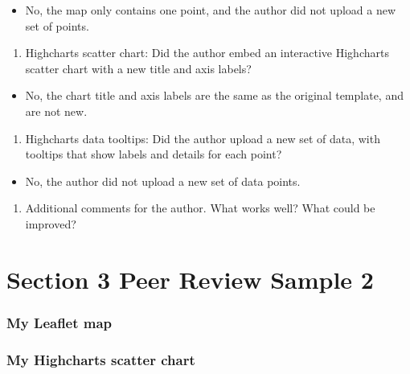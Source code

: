 \documentclass[
  english,
]{book}
\providecommand{\tightlist}{%
  \setlength{\itemsep}{0pt}\setlength{\parskip}{0pt}}
\begin{document}
\begin{itemize}
\tightlist
\item
  No, the map only contains one point, and the author did not upload a new set of points.
\end{itemize}

\begin{enumerate}
\def\labelenumi{\arabic{enumi}.}
\setcounter{enumi}{3}
\tightlist
\item
  Highcharts scatter chart: Did the author embed an interactive Highcharts scatter chart with a new title and axis labels?
\end{enumerate}

\begin{itemize}
\tightlist
\item
  No, the chart title and axis labels are the same as the original template, and are not new.
\end{itemize}

\begin{enumerate}
\def\labelenumi{\arabic{enumi}.}
\setcounter{enumi}{4}
\tightlist
\item
  Highcharts data tooltips: Did the author upload a new set of data, with tooltips that show labels and details for each point?
\end{enumerate}

\begin{itemize}
\tightlist
\item
  No, the author did not upload a new set of data points.
\end{itemize}

\begin{enumerate}
\def\labelenumi{\arabic{enumi}.}
\setcounter{enumi}{5}
\tightlist
\item
  Additional comments for the author. What works well? What could be improved?
\end{enumerate}

\hypertarget{peer-3-sample-2}{%
\section{Section 3 Peer Review Sample 2}\label{peer-3-sample-2}}

\hypertarget{my-leaflet-map-2}{%
\subsubsection{My Leaflet map}\label{my-leaflet-map-2}}

\hypertarget{my-highcharts-scatter-chart-2}{%
\subsubsection{My Highcharts scatter chart}\label{my-highcharts-scatter-chart-2}}
\end{document}
